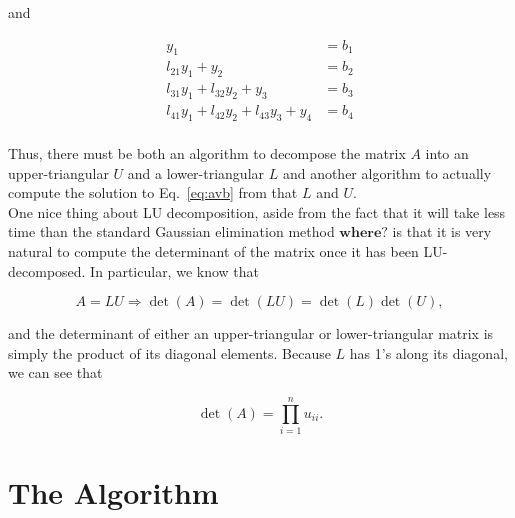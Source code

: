 \documentclass[12pt]{article}
\numberwithin{equation}{section}
\begin{document}
\noindent and

\begin{equation}
\begin{align}
y_{1}&=b_{1} \\
l_{21}y_{1}+y_{2}&=b_{2} \\
l_{31}y_{1}+l_{32}y_{2}+y_{3}&=b_{3} \\
l_{41}y_{1}+l_{42}y_{2}+l_{43}y_{3}+y_{4}&=b_{4} \\
\end{align}
\end{equation}

\noindent Thus, there must be both an algorithm to decompose the matrix $A$ into an upper-triangular $U$ and a lower-triangular $L$ and another algorithm to actually compute the solution to Eq.~\ref{eq:avb} from that $L$ and $U$.
\\\indent One nice thing about LU decomposition, aside from the fact that it will take less time than the standard Gaussian elimination method $\textbf{where?}$ is that it is very natural to compute the determinant of the matrix once it has been LU-decomposed.  In particular, we know that 

\begin{equation}
A=LU \Rightarrow \det\left(A\right)=\det\left(LU\right)=\det\left(L\right)\det\left(U\right),
\end{equation}

\noindent and the determinant of either an upper-triangular or lower-triangular matrix is simply the product of its diagonal elements.  Because $L$ has 1's along its diagonal, we can see that

\begin{equation}
\det\left(A\right)=\prod_{i=1}^{n}u_{ii}.
\end{equation}

\section{The Algorithm}
\label{sec:algorithm}
\end{document}
